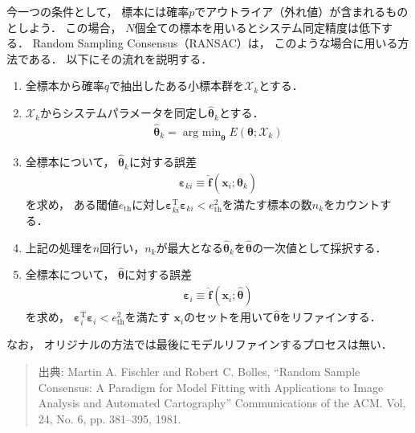 ﻿\documentclass[a4paper]{jsarticle}
\begin{document}
今一つの条件として，
標本には確率$p$でアウトライア（外れ値）が含まれるものとしよう．
この場合，
$N$個全ての標本を用いるとシステム同定精度は低下する．
Random Sampling Consensus（RANSAC）は，
このような場合に用いる方法である．
以下にその流れを説明する．
\begin{enumerate}
\item{
全標本から確率$q$で抽出したある小標本群を$\mathcal{X}_{k}$とする．
}
\item{
$\mathcal{X}_{k}$からシステムパラメータを同定し$\hat{\bm{\theta}}_{k}$とする．
\begin{align}
\hat{\bm{\theta}}_{k}=\mathop{\mathrm{arg~min}}_{\bm{\theta}}E(\bm{\theta};\mathcal{X}_{k})
\label{eq:lsm_sample}
\end{align}
}
\item{
全標本について，
$\hat{\bm{\theta}}_{k}$に対する誤差
\begin{align}
\bm{\varepsilon}_{ki}\equiv\hat{\bm{f}}(\bm{x}_{i};\hat{\bm{\theta}}_{k})
\end{align}
を求め，
ある閾値$e_{\mathrm{th}}$に対し$\bm{\varepsilon}_{ki}^{\mathrm{T}}\bm{\varepsilon}_{ki}<e_{\mathrm{th}}^{2}$を満たす標本の数$n_{k}$をカウントする．
}
\item{
上記の処理を$n$回行い，$n_{k}$が最大となる$\hat{\bm{\theta}}_{k}$を$\hat{\bm{\theta}}$の一次値として採択する．
}
\item{
全標本について，
$\hat{\bm{\theta}}$に対する誤差
\begin{align}
\bm{\varepsilon}_{i}\equiv\hat{\bm{f}}(\bm{x}_{i};\hat{\bm{\theta}})
\end{align}
を求め，
$\bm{\varepsilon}_{i}^{\mathrm{T}}\bm{\varepsilon}_{i}<e_{\mathrm{th}}^{2}$を満たす
$\bm{x}_{i}$のセットを用いて$\hat{\bm{\theta}}$をリファインする．
}
\end{enumerate}
なお，
オリジナルの方法では最後にモデルリファインするプロセスは無い．

\begin{quote}
出典:
Martin A. Fischler and Robert C. Bolles,
``Random Sample Consensus: A Paradigm for Model Fitting with Applications to Image Analysis and Automated Cartography''
Communications of the ACM. Vol, 24, No. 6, pp. 381--395, 1981.
\end{quote}
\end{document}
